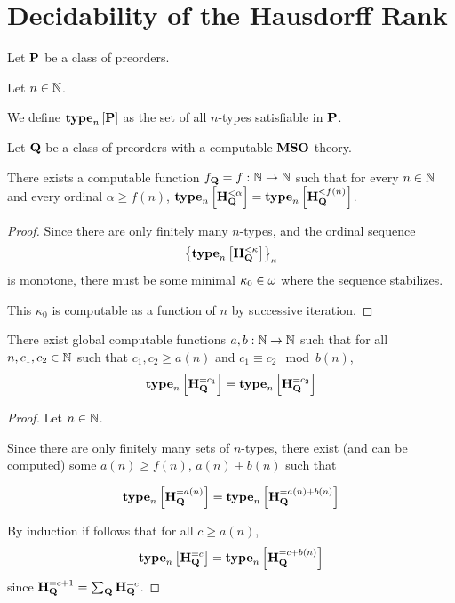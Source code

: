 \section{Decidability of the Hausdorff Rank}

\begin{definition}
    Let $\mathbf{P}$ be a class of preorders.

    Let $n \in \mathbb{N}$.

    We define $\mathbf{type}_{n} \left[ {\mathbf{P}} \right]$ as the set of all
    $n$-types satisfiable in $\mathbf{P}$.
\end{definition}

\begin{lemma}\label{f-lemma}
    Let $\mathbf{Q}$ be a class of preorders
    with a computable $\mathbf{MSO}$-theory.

    There exists a computable function $f_{\mathbf{Q}} = f: \mathbb{N} \to \mathbb{N}$ such that
    for every $n \in \mathbb{N}$ and every ordinal $\alpha \ge f(n)$,
    $\mathbf{type}_{n} \left[ {\mathbf{H}_{\mathbf{Q}}^{< \alpha}} \right] = \mathbf{type}_{n} \left[ {\mathbf{H}_{\mathbf{Q}}^{< f(n)}} \right]$.
\end{lemma}

\begin{proof}
    Since there are only finitely many $n$-types,
    and the ordinal sequence \[\left\{ {\mathbf{type}_{n} \left[ {\mathbf{H}_{\mathbf{Q}}^{< \kappa}} \right]} \right\}_{\kappa}\]
    is monotone,
    there must be some minimal $\kappa_0 \in \omega$ where the sequence stabilizes.

    This $\kappa_0$ is computable as a function of $n$ by successive iteration.
\end{proof}

\begin{lemma}\label{ab-lemma}
    There exist global computable functions $a, b : \mathbb{N} \to \mathbb{N}$ such that
    for all $n, c_1, c_2 \in \mathbb{N}$ such that $c_1, c_2 \ge a(n)$ and $c_1 \equiv c_2 \mod b(n)$,
    \[\mathbf{type}_{n} \left[ {\mathbf{H}_{\mathbf{Q}}^{= c_1}} \right] = \mathbf{type}_{n} \left[ {\mathbf{H}_{\mathbf{Q}}^{= c_2}} \right]\]
\end{lemma}

\begin{proof}
    Let $n \in \mathbb{N}$.

    Since there are only finitely many sets of $n$-types,
    there exist (and can be computed)
    some $a(n) \ge f(n)$, $a(n) + b(n)$ such that

    \[
        \mathbf{type}_{n} \left[ {\mathbf{H}_{\mathbf{Q}}^{= a(n)}} \right] = \mathbf{type}_{n} \left[ {\mathbf{H}_{\mathbf{Q}}^{= a(n) + b(n)}} \right]
    \]

    By induction if follows that for all $c \ge a(n)$,
    \[
        \mathbf{type}_{n} \left[ {\mathbf{H}_{\mathbf{Q}}^{= c}} \right] = \mathbf{type}_{n} \left[ {\mathbf{H}_{\mathbf{Q}}^{= c + b(n)}} \right]
    \]
    since $\mathbf{H}_{\mathbf{Q}}^{= c + 1} = \sum_{\mathbf{Q}} \mathbf{H}_{\mathbf{Q}}^{= c}$.
\end{proof}

